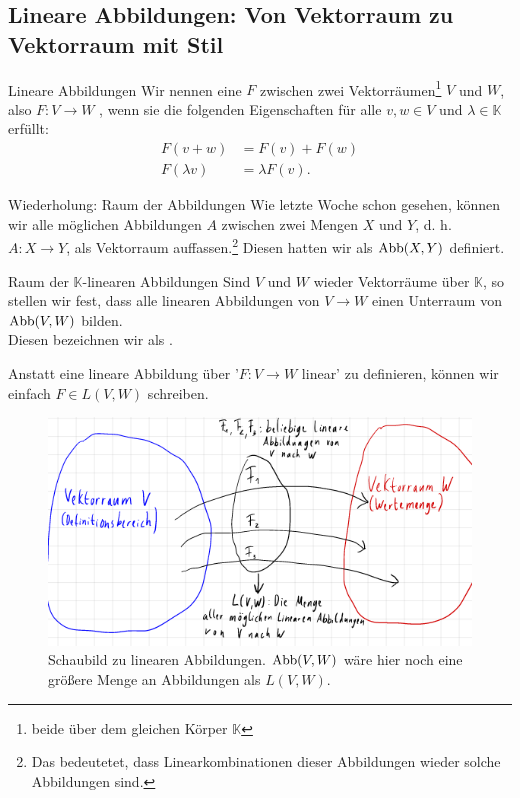 \subsection{Lineare Abbildungen: Von Vektorraum zu Vektorraum mit Stil}\label{ssec:LineareAbbildungen}
\begin{Def}
{Lineare Abbildungen}
Wir nennen eine  $F$ zwischen zwei Vektorräumen\footnote{beide über dem gleichen Körper $\mathbb{K}$} $V$ und $W$, also $F:V\to W$ , wenn sie die folgenden Eigenschaften für alle $v,w\in V$ und $\lambda\in\mathbb{K}$ erfüllt:
\begin{align*}
    F(v+w)&=F(v)+F(w)\\
    F(\lambda v)&=\lambda F(v).
\end{align*}
\end{Def}
\begin{Def}
{Wiederholung: Raum der Abbildungen}
Wie letzte Woche schon gesehen, können wir alle möglichen Abbildungen $A$ zwischen zwei Mengen $X$ und $Y$, d. h. $A:X\to Y$, als Vektorraum auffassen.\footnote{Das bedeutetet, dass Linearkombinationen dieser Abbildungen wieder solche Abbildungen sind.} Diesen hatten wir als $\text{Abb}(X,Y)$ definiert.
\end{Def}
\begin{Def}
{Raum der $\mathbb{K}$-linearen Abbildungen}
Sind $V$ und $W$ wieder Vektorräume über $\mathbb{K}$, so stellen wir fest, dass alle linearen Abbildungen von $V\to W$ einen Unterraum von $\text{Abb}(V,W)$ bilden.\\
Diesen bezeichnen wir als .
\end{Def}
Anstatt eine lineare Abbildung über '$F:V\to W$ linear' zu definieren, können wir einfach $F\in L(V,W)$ schreiben.
\begin{figure}[htbp]
\centering
\includegraphics[width=.6\textwidth]{Dateien/00/12LinAbbSchaubild.PNG}
\caption*{Schaubild zu linearen Abbildungen. $\text{Abb}(V,W)$ wäre hier noch eine größere Menge an Abbildungen als $L(V,W)$.}
\end{figure}
